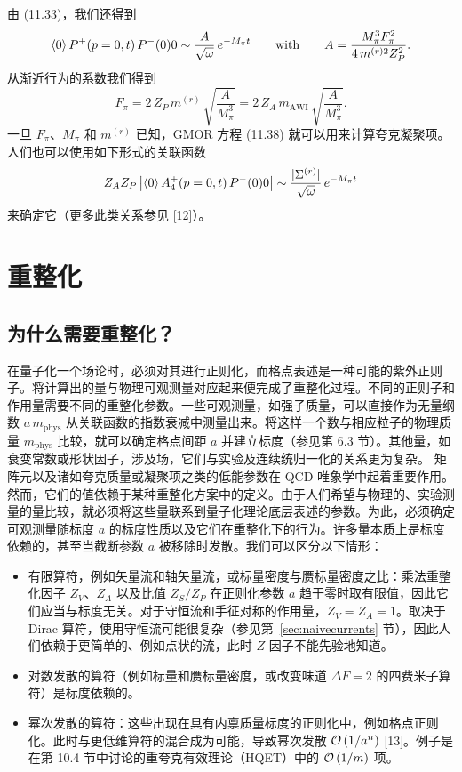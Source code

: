由 (11.33)，我们还得到
\begin{equation}
\left\langle 0 \right\rangle{P^+(p = 0, t)\,P^-(0)}{0} \sim \frac{A}{\sqrt{\omega}}\, e^{-M_\pi t}
\qquad\text{with}\qquad
A = \frac{M_\pi^3 F_\pi^2}{4\,m^{(r)2} Z_P^2} .
\end{equation}
从渐近行为的系数我们得到
\begin{equation}
F_\pi = 2\,Z_P\, m^{(r)}\, \sqrt{\frac{A}{M_\pi^3}}
= 2\,Z_A\, m_{\mathrm{AWI}}\, \sqrt{\frac{A}{M_\pi^3}} .
\end{equation}
一旦 $F_\pi$、$M_\pi$ 和 $m^{(r)}$ 已知，GMOR 方程 (11.38) 就可以用来计算夸克凝聚项。人们也可以使用如下形式的关联函数
\begin{equation}
Z_A Z_P\, \bigl|\left\langle 0 \right\rangle{A_4^+(p = 0, t)\,P^-(0)}{0}\bigr| \sim \frac{|\Sigma^{(r)}|}{\sqrt{\omega}}\, e^{-M_\pi t}
\end{equation}
来确定它（更多此类关系参见 [12]）。

\section{重整化}
\label{sec:renorm}
\subsection{为什么需要重整化？}
在量子化一个场论时，必须对其进行正则化，而格点表述是一种可能的紫外正则子。将计算出的量与物理可观测量对应起来便完成了重整化过程。不同的正则子和作用量需要不同的重整化参数。一些可观测量，如强子质量，可以直接作为无量纲数 $a\,m_{\mathrm{phys}}$ 从关联函数的指数衰减中测量出来。将这样一个数与相应粒子的物理质量 $m_{\mathrm{phys}}$ 比较，就可以确定格点间距 $a$ 并建立标度（参见第 6.3 节）。其他量，如衰变常数或形状因子，涉及场，它们与实验及连续统归一化的关系更为复杂。
矩阵元以及诸如夸克质量或凝聚项之类的低能参数在 QCD 唯象学中起着重要作用。然而，它们的值依赖于某种重整化方案中的定义。由于人们希望与物理的、实验测量的量比较，就必须将这些量联系到量子化理论底层表述的参数。为此，必须确定可观测量随标度 $a$ 的标度性质以及它们在重整化下的行为。许多量本质上是标度依赖的，甚至当截断参数 $a$ 被移除时发散。我们可以区分以下情形：
\begin{itemize}
\item 有限算符，例如矢量流和轴矢量流，或标量密度与赝标量密度之比：乘法重整化因子 $Z_V$、$Z_A$ 以及比值 $Z_S/Z_P$ 在正则化参数 $a$ 趋于零时取有限值，因此它们应当与标度无关。对于守恒流和手征对称的作用量，$Z_V = Z_A = 1$。取决于 Dirac 算符，使用守恒流可能很复杂（参见第~\ref{sec:naivecurrents} 节），因此人们依赖于更简单的、例如点状的流，此时 $Z$ 因子不能先验地知道。
\item 对数发散的算符（例如标量和赝标量密度，或改变味道 $\Delta F = 2$ 的四费米子算符）是标度依赖的。
\item 幂次发散的算符：这些出现在具有内禀质量标度的正则化中，例如格点正则化。此时与更低维算符的混合成为可能，导致幂次发散 $\mathcal{O}\left(1/a^n\right)$ [13]。例子是在第 10.4 节中讨论的重夸克有效理论（HQET）中的 $\mathcal{O}\left(1/m\right)$ 项。
\end{itemize}

